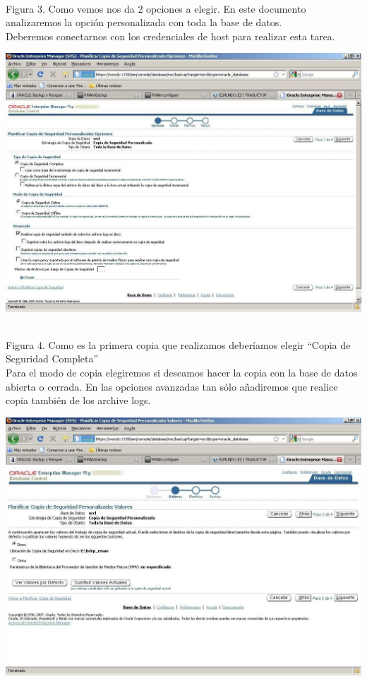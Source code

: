 \begin{enumerate}[1.]
\begin{center}
	\end{center}
	\\Figura 3. Como vemos nos da 2 opciones a elegir. En este documento analizaremos la opción personalizada con toda la base de datos.
  	\\ Deberemos conectarnos con los credenciales de host para realizar esta tarea.
	\begin{center}
	\includegraphics[width=15cm]{./Imagenes/img-4-2-3}  
	\end{center}
	\\Figura 4. Como  es  la  primera  copia  que  realizamos  deberíamos  elegir  “Copia  de  Seguridad Completa”
	\\Para el modo de copia elegiremos si deseamos hacer la copia con la base de datos abierta o cerrada. En las opciones avanzadas tan sólo añadiremos que realice copia también de los archive logs.
	\begin{center}
	\includegraphics[width=15cm]{./Imagenes/img-4-2-4}  

\end{center}
\end{enumerate}
